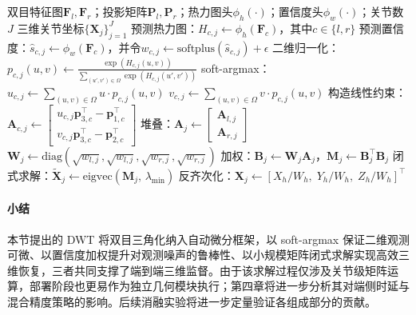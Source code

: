 \begin{algorithm}
  \caption{可微加权三角化姿态求解（双目）}
  \label{alg:dwt_stereo}
  \renewcommand{\algorithmicrequire}{输入：}
  \renewcommand{\algorithmicensure}{输出：}
  \begin{algorithmic}[1]
    \REQUIRE 双目特征图$\mathbf{F}_l,\mathbf{F}_r$；投影矩阵$\mathbf{P}_l,\mathbf{P}_r$；热力图头$\phi_h(\cdot)$；置信度头$\phi_w(\cdot)$；关节数$J$
    \ENSURE 三维关节坐标$\{\mathbf{X}_j\}_{j=1}^{J}$
    \STATE 预测热力图：$H_{c,j}\gets \phi_h(\mathbf{F}_c)$，其中$c\in\{l,r\}$
    \STATE 预测置信度：$\hat{s}_{c,j}\gets \phi_w(\mathbf{F}_c)$，并令$w_{c,j}\gets \mathrm{softplus}(\hat{s}_{c,j})+\epsilon$
        \STATE 二维归一化：$p_{c,j}(u,v)\gets \frac{\exp(H_{c,j}(u,v))}{\sum_{(u',v')\in\Omega}\exp(H_{c,j}(u',v'))}$
        \STATE soft-argmax：$u_{c,j}\gets \sum_{(u,v)\in\Omega}u\cdot p_{c,j}(u,v)$
        \STATE \hspace{4.5em}$v_{c,j}\gets \sum_{(u,v)\in\Omega}v\cdot p_{c,j}(u,v)$
        \STATE 构造线性约束：$\mathbf{A}_{c,j}\gets\begin{bmatrix}
          u_{c,j}\mathbf{p}_{3,c}^\top-\mathbf{p}_{1,c}^\top\\
          v_{c,j}\mathbf{p}_{3,c}^\top-\mathbf{p}_{2,c}^\top
        \end{bmatrix}$
      \ENDFOR
      \STATE 堆叠：$\mathbf{A}_j\gets \begin{bmatrix}\mathbf{A}_{l,j}\\ \mathbf{A}_{r,j}\end{bmatrix}$
      \STATE \hspace{2.5em}$\mathbf{W}_j\gets \mathrm{diag}(\sqrt{w_{l,j}},\sqrt{w_{l,j}},\sqrt{w_{r,j}},\sqrt{w_{r,j}})$
      \STATE 加权：$\mathbf{B}_j\gets \mathbf{W}_j\mathbf{A}_j$，$\mathbf{M}_j\gets \mathbf{B}_j^\top\mathbf{B}_j$
      \STATE 闭式求解：$\tilde{\mathbf{X}}_j\gets \mathrm{eigvec}(\mathbf{M}_j,\,\lambda_{\min})$ 
      \STATE 反齐次化：$\mathbf{X}_j\gets [X_h/W_h,\;Y_h/W_h,\;Z_h/W_h]^\top$
    \ENDFOR
  \end{algorithmic}
\end{algorithm}

\paragraph{小结}
本节提出的 DWT 将双目三角化纳入自动微分框架，以 soft-argmax 保证二维观测可微、以置信度加权提升对观测噪声的鲁棒性、以小规模矩阵闭式求解实现高效三维恢复，三者共同支撑了端到端三维监督。由于该求解过程仅涉及关节级矩阵运算，部署阶段也更易作为独立几何模块执行；第四章将进一步分析其对端侧时延与混合精度策略的影响。后续消融实验将进一步定量验证各组成部分的贡献。


